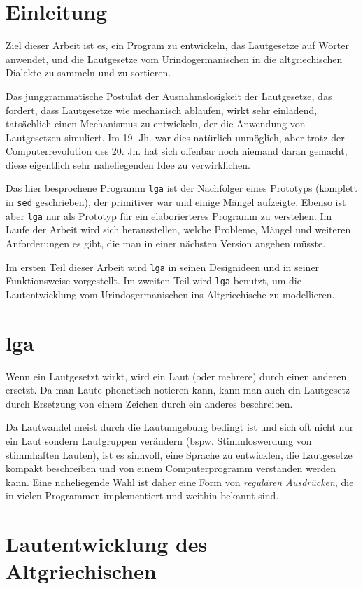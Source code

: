 \documentclass[12pt,a4paper,normalheadings]{scrartcl}
\begin{document}
\section{Einleitung}

Ziel dieser Arbeit ist es, ein Program zu entwickeln,
das Lautgesetze auf Wörter anwendet,
und die Lautgesetze vom Urindogermanischen in die altgriechischen Dialekte
zu sammeln und zu sortieren.

Das junggrammatische Postulat der Ausnahmslosigkeit der Lautgesetze,
das fordert, dass Lautgesetze wie mechanisch ablaufen,
wirkt sehr einladend,
tatsächlich einen Mechanismus zu entwickeln,
der die Anwendung von Lautgesetzen simuliert.
Im 19. Jh. war dies natürlich unmöglich,
aber trotz der Computerrevolution des 20. Jh. hat sich offenbar
noch niemand daran gemacht,
diese eigentlich sehr naheliegenden Idee zu verwirklichen.

Das hier besprochene Programm \texttt{lga} ist
der Nachfolger eines Prototyps (komplett in \texttt{sed} geschrieben),
der primitiver war und einige Mängel aufzeigte.
Ebenso ist aber \texttt{lga} nur als Prototyp
für ein elaborierteres Programm zu verstehen.
Im Laufe der Arbeit wird sich herausstellen,
welche Probleme, Mängel und weiteren Anforderungen es gibt,
die man in einer nächsten Version angehen müsste.

Im ersten Teil dieser Arbeit wird \texttt{lga}
in seinen Designideen und in seiner Funktionsweise vorgestellt.
Im zweiten Teil wird \texttt{lga} benutzt,
um die Lautentwicklung vom Urindogermanischen ins Altgriechische zu modellieren.

\section{lga}

Wenn ein Lautgesetzt wirkt,
wird ein Laut (oder mehrere) durch einen anderen ersetzt.
Da man Laute phonetisch notieren kann,
kann man auch ein Lautgesetz durch Ersetzung
von einem Zeichen durch ein anderes beschreiben.

Da Lautwandel meist durch die Lautumgebung bedingt ist
und sich oft nicht nur ein Laut sondern Lautgruppen verändern
(bspw. Stimmloswerdung von stimmhaften Lauten),
ist es sinnvoll,
eine Sprache zu entwicklen,
die Lautgesetze kompakt beschreiben
und von einem Computerprogramm verstanden werden kann.
Eine naheliegende Wahl ist daher eine Form von \emph{regulären Ausdrücken},
die in vielen Programmen implementiert und weithin bekannt sind.

\section{Lautentwicklung des Altgriechischen}

\printbibliography
\end{document}
